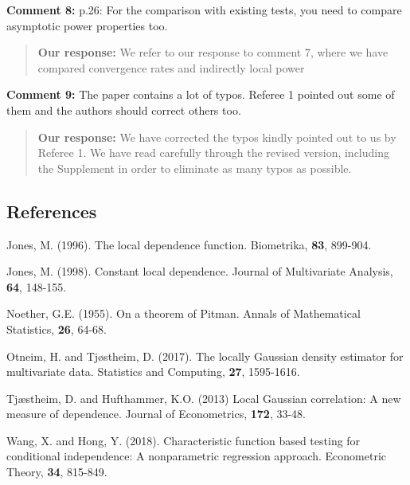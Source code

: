 \documentclass[
  12pt,
  letterpaper]{article}
\numberwithin{equation}{section}
\begin{document}
\textbf{Comment 8:} p.26: For the comparison with existing tests, you need to compare asymptotic power properties too.

\begin{quote}
\textbf{Our response:} We refer to our response to comment 7, where we have compared convergence rates and indirectly local power
\end{quote}

\textbf{Comment 9:} The paper contains a lot of typos. Referee 1 pointed out some of them and the authors should correct others too.

\begin{quote}
\textbf{Our response:} We have corrected the typos kindly pointed out to us by Referee 1. We have read carefully through the revised version, including the Supplement in order to eliminate as many typos as possible.
\end{quote}

\hypertarget{references}{%
\subsection{References}\label{references}}

Jones, M. (1996). The local dependence function. Biometrika, \textbf{83}, 899-904.

Jones, M. (1998). Constant local dependence. Journal of Multivariate Analysis, \textbf{64}, 148-155.

Noether, G.E. (1955). On a theorem of Pitman. Annals of Mathematical Statistics, \textbf{26}, 64-68.

Otneim, H. and Tjøstheim, D. (2017). The locally Gaussian density estimator for multivariate data. Statistics and Computing, \textbf{27}, 1595-1616.

Tjæstheim, D. and Hufthammer, K.O. (2013) Local Gaussian correlation: A new measure of dependence. Journal of Econometrics, \textbf{172}, 33-48.

Wang, X. and Hong, Y. (2018). Characteristic function based testing for conditional independence: A nonparametric regression approach. Econometric Theory, \textbf{34}, 815-849.
\end{document}
